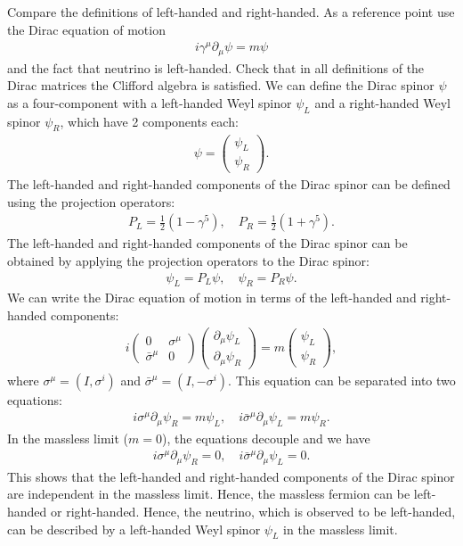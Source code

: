 \clearpage
{}
Compare the definitions of left-handed and right-handed. As a reference point use the Dirac equation of motion
\begin{align}
    i \gamma^\mu \partial_\mu \psi = m \psi
\end{align}
and the fact that neutrino is left-handed. Check that in all definitions of the
Dirac matrices the Clifford algebra is satisfied.
\answer{}
We can define the Dirac spinor $\psi$ as a four-component with a left-handed Weyl spinor $\psi_L$ and a right-handed Weyl spinor $\psi_R$, which have 2 components each:
\begin{align}
    \psi = \begin{pmatrix}
        \psi_L \\
        \psi_R
    \end{pmatrix}.
\end{align}
The left-handed and right-handed components of the Dirac spinor can be defined using the projection operators:
\begin{align}
    P_L = \frac{1}{2}(1 - \gamma^5), \quad P_R = \frac{1}{2}(1 + \gamma^5).
\end{align}
The left-handed and right-handed components of the Dirac spinor can be obtained by applying the projection operators to the Dirac spinor:
\begin{align}
    \psi_L = P_L \psi, \quad \psi_R = P_R \psi.
\end{align}
We can write the Dirac equation of motion in terms of the left-handed and right-handed components:
\begin{align}
    i \begin{pmatrix}
        0 & \sigma^\mu \\
        \bar{\sigma}^\mu & 0
    \end{pmatrix}
    \begin{pmatrix}
        \partial_\mu \psi_L \\
        \partial_\mu \psi_R
    \end{pmatrix} = m \begin{pmatrix}
        \psi_L \\
        \psi_R
    \end{pmatrix},
\end{align}
where $\sigma^\mu = (I, \sigma^i)$ and $\bar{\sigma}^\mu = (I, -\sigma^i)$. This equation can be separated into two equations:
\begin{align}
    i \sigma^\mu \partial_\mu \psi_R = m \psi_L, \quad
    i \bar{\sigma}^\mu \partial_\mu \psi_L = m \psi_R.
\end{align}
In the massless limit ($m=0$), the equations decouple and we have
\begin{align}
    i \sigma^\mu \partial_\mu \psi_R = 0, \quad
    i \bar{\sigma}^\mu \partial_\mu \psi_L = 0.
\end{align}
This shows that the left-handed and right-handed components of the Dirac spinor are independent in the massless limit. Hence, the massless fermion can be left-handed or right-handed. Hence, the neutrino, which is observed to be left-handed, can be described by a left-handed Weyl spinor $\psi_L$ in the massless limit.

